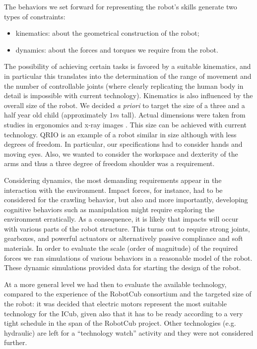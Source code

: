The behaviors we set forward for representing the robot's skills generate two 
types of constraints:
\begin{itemize}
	\item kinematics: about the geometrical construction of the robot;
	\item dynamics: about the forces and torques we require from the robot.
\end{itemize}

The possibility of achieving certain tasks is favored by a suitable kinematics, 
and in particular this translates into the determination of the range of movement 
and the number of controllable joints (where clearly replicating the human body 
in detail is impossible with current technology). Kinematics is also 
influenced by the overall size of the robot. We decided {\em a priori} to target the 
size of a three and a half year old child (approximately $1m$ tall). Actual 
dimensions were taken from studies in ergonomics and x-ray images \cite{tilley01measure}. 
This size can be achieved with current technology. QRIO \cite{sony-qrio} is an example 
of a robot similar in size although with less degrees of freedom. In particular, 
our specifications had to consider hands and moving eyes. Also, we wanted to 
consider the workspace and dexterity of the arms and thus a three degree of 
freedom shoulder was a requirement. 


Considering dynamics, the most demanding requirements appear in the 
interaction with the environment. Impact forces, for instance, had to be 
considered for the crawling behavior, but also and more importantly, developing 
cognitive behaviors such as manipulation might require exploring the environment 
erratically. As a consequence, it is likely that impacts will occur with
various parts of the robot structure. This turns out to require strong 
joints, gearboxes, and powerful actuators or alternatively
passive compliance and soft materials. In order to evaluate 
the scale (order of magnitude) of the required forces we ran simulations 
of various behaviors in a reasonable model of the robot. These dynamic simulations 
provided data for starting the design of the robot.

At a more general level we had then to evaluate the available technology, compared 
to the experience of the RobotCub consortium and the targeted size of the robot: 
it was decided that electric motors represent the most suitable technology for 
the ICub, given also that it has to be ready according to a very 
tight schedule in the span of the RobotCub project. Other technologies 
(e.g. hydraulic) are left for a ``technology watch'' activity and they were 
not considered further.

